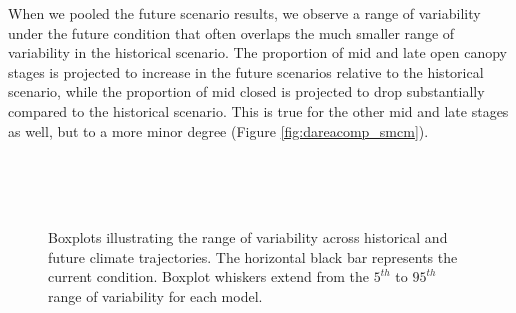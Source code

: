 \documentclass[12pt]{article}
\begin{document}
\begin{spacing}{1}
When we pooled the future scenario results, we observe a range of variability under the future condition that often overlaps the much smaller range of variability in the historical scenario. The proportion of mid and late open canopy stages is projected to increase in the future scenarios relative to the historical scenario, while the proportion of mid closed is projected to drop substantially compared to the historical scenario. This is true for the other mid and late stages as well, but to a more minor degree (Figure \ref{fig:dareacomp_smcm}). %

\begin{figure}[htbp]
  \centering
   \\
   \\
     \\
    \caption{Boxplots illustrating the range of variability across historical and future climate trajectories. The horizontal black bar represents the current condition. Boxplot whiskers extend from the $5^{th}$ to $95^{th}$ range of variability for each model. }
  \label{fig:covcond_smcm}
\end{figure} %


\end{spacing}
\end{document}
